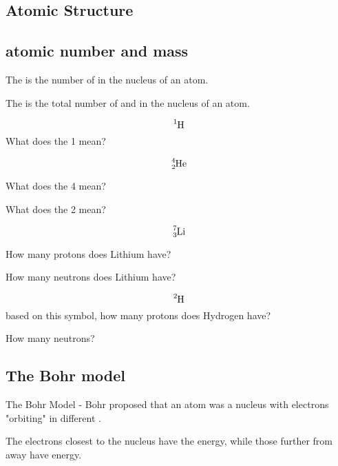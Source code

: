 \documentclass[12pt]{exam}
\begin{document}
    
\begin{questions}
        
\section{Atomic Structure}

\subsection{atomic number and mass}

\question The  is the number of \fillin[protons][3cm] in the nucleus of an atom.

\question The  is the total number of \fillin[protons][2cm] and \fillin[neutrons][2cm]in the nucleus of an atom.



\question $$\ce{^{1}_{}H}$$
What does the 1 mean?

\fillwithlines{2cm}


\question $$\ce{^{4}_{2}He}$$

\question What does the 4 mean? 

\fillwithlines{1cm}

\question What does the 2 mean?
\fillwithlines{1cm}

\question $$\ce{^{7}_{3}Li}$$

How many protons does Lithium have? \fillin[3][2cm]

How many neutrons does Lithium have? \fillin[4][2cm]

\question $$\ce{^{2}_{}H}$$ based on this symbol, how many protons does Hydrogen have? \fillin[1][1cm]

How many neutrons? \fillin[1][1cm]

\vspace{3cm}

\subsection{The Bohr model}

\question   The Bohr Model - Bohr proposed that an atom was a nucleus with electrons "orbiting" in different .

\question The electrons closest to the nucleus have the \fillin[lowest] energy, while those further from away have \fillin[higher] energy.

\end{questions}
\end{document}
